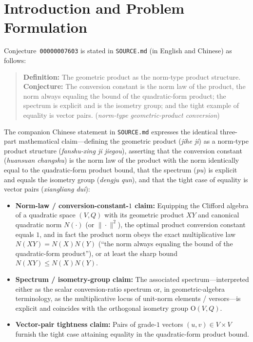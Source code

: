 \documentclass[11pt]{article}
\theoremstyle{definition}
\newcommand{\Orth}{\mathrm{O}}
\begin{document}
\section{Introduction and Problem Formulation}

Conjecture~\texttt{00000007603} is stated in \texttt{SOURCE.md} (in English and Chinese) as follows:

\begin{quote}
\textbf{Definition:} The geometric product as the norm-type product structure.\\
\textbf{Conjecture:} The conversion constant is the norm law of the product, the norm always equaling the bound of the quadratic-form product; the spectrum is explicit and is the isometry group; and the tight example of equality is vector pairs. (\emph{norm-type geometric-product conversion})
\end{quote}

The companion Chinese statement in \texttt{SOURCE.md} expresses the identical three-part mathematical claim---defining the geometric product (\emph{jihe ji}) as a norm-type product structure (\emph{fanshu-xing ji jiegou}), asserting that the conversion constant (\emph{huansuan changshu}) is the norm law of the product with the norm identically equal to the quadratic-form product bound, that the spectrum (\emph{pu}) is explicit and equals the isometry group (\emph{dengju qun}), and that the tight case of equality is vector pairs (\emph{xiangliang dui}):
\begin{itemize}
  \item[(I)] \textbf{Norm-law / conversion-constant-$1$ claim:} Equipping the Clifford algebra of a quadratic space $(V,Q)$ with its geometric product $XY$ and canonical quadratic norm $N(\cdot)$ (or $\|\cdot\|^2$), the optimal product conversion constant equals $1$, and in fact the product norm obeys the exact multiplicative law $N(XY)=N(X)N(Y)$ (``the norm always equaling the bound of the quadratic-form product''), or at least the sharp bound $N(XY)\le N(X)N(Y)$.
  \item[(II)] \textbf{Spectrum / isometry-group claim:} The associated spectrum---interpreted either as the scalar conversion-ratio spectrum or, in geometric-algebra terminology, as the multiplicative locus of unit-norm elements / versors---is explicit and coincides with the orthogonal isometry group $\Orth(V,Q)$.
  \item[(III)] \textbf{Vector-pair tightness claim:} Pairs of grade-$1$ vectors $(u,v)\in V\times V$ furnish the tight case attaining equality in the quadratic-form product bound.
\end{itemize}
\end{document}
